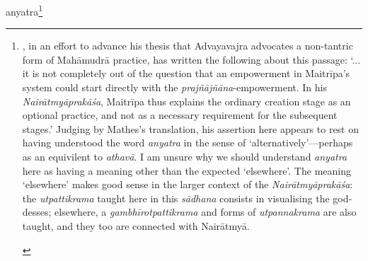 \documentclass[naipra.tex]{subfiles}
\begin{document}
\begin{sanskrit}
\pstart
anyatra\footnote{\begin{english}
	\textcites[374]{mathes2014}[132]{mathes2021}, in an effort to advance his thesis that Advayavajra advocates a non-tantric form of Mahāmudrā practice, has written the following about this passage: `... it is not completely out of the question that an empowerment in Maitrīpa's system could start directly with the \emph{prajñājñāna}-empowerment. In his \emph{Nairātmyāprakāśa}, Maitrīpa thus explains the ordinary creation stage as an optional practice, and not as a necessary requirement for the subsequent stages.' 
	Judging by Mathes's translation, his assertion here appears to rest on having understood the word \emph{anyatra} in the sense of `alternatively'—perhaps as an equivilent to \emph{athavā}.
	I am unsure why we should understand \emph{anyatra} here as having a meaning other than the expected `elsewhere'.
	The meaning `elsewhere' makes good sense in the larger context of the \emph{Nairātmyāprakāśa}: the \emph{utpattikrama} taught here in this \emph{sādhana} consists in visualising the goddesses; elsewhere, a \emph{gambhīrotpattikrama} and forms of \emph{utpannakrama} are also taught, and they too are connected with Nairātmyā.


\end{english}}
\end{sanskrit}
\end{document}

